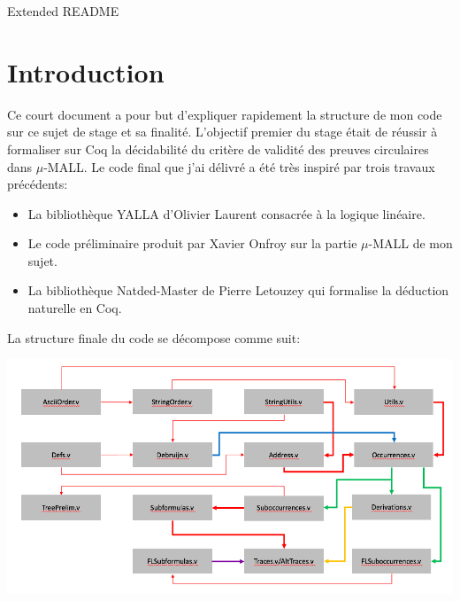 \documentclass[12pt]{article}
\theoremstyle{break}
\begin{document}
\begin{center}
{\large Extended README} \\ %
\end{center}
\section{Introduction}
Ce court document a pour but d'expliquer rapidement la structure de mon code sur ce sujet de stage et sa finalité.
L'objectif premier du stage était de réussir à formaliser sur Coq la décidabilité du critère de validité des preuves circulaires
dans $\mu$-MALL. 
Le code final que j'ai délivré a été très inspiré par trois travaux précédents:
\begin{itemize}
\item La bibliothèque YALLA d'Olivier Laurent consacrée à la logique linéaire.
\item Le code préliminaire produit par Xavier Onfroy sur la partie $\mu$-MALL de mon sujet.
\item La bibliothèque Natded-Master de Pierre Letouzey qui formalise la déduction naturelle en Coq.
\end{itemize}
La structure finale du code se décompose comme suit: 
\begin{center}
\includegraphics[scale=0.4]{Links.png}
\end{center}
\end{document}
